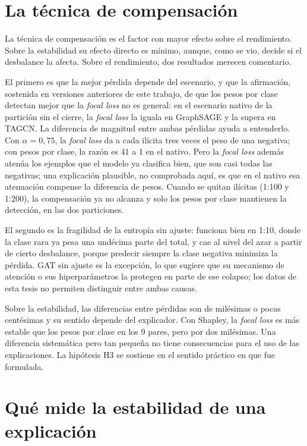 \section{La técnica de compensación}\label{sec:dis_h3}

La técnica de compensación es el factor con mayor efecto sobre el rendimiento. Sobre la
estabilidad su efecto directo es mínimo, aunque, como se vio, decide si el desbalance la afecta. Sobre el rendimiento, dos resultados merecen comentario.

El primero es que la mejor pérdida depende del escenario, y que la afirmación, sostenida en
versiones anteriores de este trabajo, de que los pesos por clase detectan mejor que la
\textit{focal loss} no es general: en el escenario nativo de la partición sin el cierre, la
\textit{focal loss} la iguala en GraphSAGE y la supera en TAGCN. La diferencia de magnitud entre
ambas pérdidas ayuda a entenderlo. Con $\alpha = 0{,}75$, la \textit{focal loss} da a cada
ilícita tres veces el peso de una negativa; con pesos por clase, la razón es 41 a 1 en el
nativo. Pero la \textit{focal loss} además atenúa los ejemplos que el modelo ya clasifica bien,
que son casi todas las negativas; una explicación plausible, no comprobada aquí, es que en el
nativo esa atenuación compense la diferencia de pesos. Cuando se quitan ilícitas (1:100 y 1:200), la compensación ya no alcanza y solo los pesos
por clase mantienen la detección, en las dos particiones.

El segundo es la fragilidad de la entropía sin ajuste: funciona bien en 1:10, donde la clase rara
ya pesa una undécima parte del total, y cae al nivel del azar a partir de cierto desbalance,
porque predecir siempre la clase negativa minimiza la pérdida. GAT sin ajuste es la excepción,
lo que sugiere que su mecanismo de atención o sus hiperparámetros la protegen en parte de ese
colapso; los datos de esta tesis no permiten distinguir entre ambas causas.

Sobre la estabilidad, las diferencias entre pérdidas son de milésimas o pocas centésimas y su
sentido depende del explicador. Con Shapley, la \textit{focal loss} es más estable que los pesos
por clase en los 9 pares, pero por dos milésimas. Una diferencia sistemática pero tan pequeña no
tiene consecuencias para el uso de las explicaciones. La hipótesis H3 se sostiene en el sentido
práctico en que fue formulada.

\section{Qué mide la estabilidad de una explicación}\label{sec:dis_medida}

